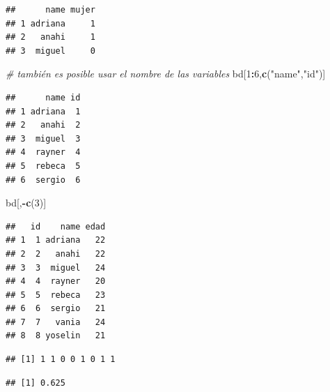 \documentclass[
]{book}
\newenvironment{Shaded}{\begin{snugshade}}{\end{snugshade}}
\newcommand{\CommentTok}[1]{\textcolor[rgb]{0.56,0.35,0.01}{\textit{#1}}}
\newcommand{\DecValTok}[1]{\textcolor[rgb]{0.00,0.00,0.81}{#1}}
\newcommand{\KeywordTok}[1]{\textcolor[rgb]{0.13,0.29,0.53}{\textbf{#1}}}
\newcommand{\NormalTok}[1]{#1}
\newcommand{\OperatorTok}[1]{\textcolor[rgb]{0.81,0.36,0.00}{\textbf{#1}}}
\newcommand{\StringTok}[1]{\textcolor[rgb]{0.31,0.60,0.02}{#1}}
\begin{document}
\begin{verbatim}
##      name mujer
## 1 adriana     1
## 2   anahi     1
## 3  miguel     0
\end{verbatim}

\begin{Shaded}
\begin{Highlighting}[]
\CommentTok{# también es posible usar el nombre de las variables }
\NormalTok{bd[}\DecValTok{1}\OperatorTok{:}\DecValTok{6}\NormalTok{,}\KeywordTok{c}\NormalTok{(}\StringTok{"name"}\NormalTok{,}\StringTok{"id"}\NormalTok{)]}
\end{Highlighting}
\end{Shaded}

\begin{verbatim}
##      name id
## 1 adriana  1
## 2   anahi  2
## 3  miguel  3
## 4  rayner  4
## 5  rebeca  5
## 6  sergio  6
\end{verbatim}

\begin{Shaded}
\begin{Highlighting}[]
\NormalTok{bd[,}\OperatorTok{-}\KeywordTok{c}\NormalTok{(}\DecValTok{3}\NormalTok{)]}
\end{Highlighting}
\end{Shaded}

\begin{verbatim}
##   id    name edad
## 1  1 adriana   22
## 2  2   anahi   22
## 3  3  miguel   24
## 4  4  rayner   20
## 5  5  rebeca   23
## 6  6  sergio   21
## 7  7   vania   24
## 8  8 yoselin   21
\end{verbatim}

\begin{Shaded}
\end{Shaded}

\begin{verbatim}
## [1] 1 1 0 0 1 0 1 1
\end{verbatim}

\begin{Shaded}
\end{Shaded}

\begin{verbatim}
## [1] 0.625
\end{verbatim}
\end{document}
